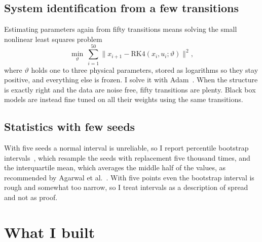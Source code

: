 \documentclass[11pt,a4paper]{article}
\begin{document}
\subsection{System identification from a few transitions}
Estimating parameters again from fifty transitions means solving the small nonlinear least squares problem
\begin{equation}
\min_{\vartheta}\ \sum_{i=1}^{50}\big\|x_{i+1}-\mathrm{RK4}(x_i,u_i;\vartheta)\big\|^2 ,
\end{equation}
where $\vartheta$ holds one to three physical parameters, stored as logarithms so they stay positive, and everything else is frozen. I solve it with Adam~\cite{kingma2015adam}. When the structure is exactly right and the data are noise free, fifty transitions are plenty. Black box models are instead fine tuned on all their weights using the same transitions.

\subsection{Statistics with few seeds}
With five seeds a normal interval is unreliable, so I report percentile bootstrap intervals~\cite{efron1979bootstrap}, which resample the seeds with replacement five thousand times, and the interquartile mean, which averages the middle half of the values, as recommended by Agarwal et al.~\cite{agarwal2021precipice}. With five points even the bootstrap interval is rough and somewhat too narrow, so I treat intervals as a description of spread and not as proof.

\section{What I built}
\end{document}
